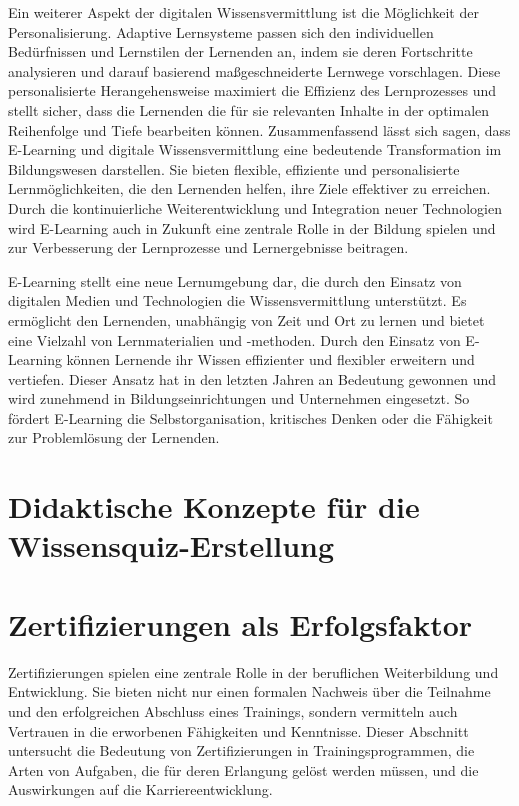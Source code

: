 Ein weiterer Aspekt der digitalen Wissensvermittlung ist die Möglichkeit der Personalisierung. Adaptive Lernsysteme passen sich den individuellen Bedürfnissen und Lernstilen der Lernenden an, indem sie deren Fortschritte analysieren und darauf basierend maßgeschneiderte Lernwege vorschlagen. Diese personalisierte Herangehensweise maximiert die Effizienz des Lernprozesses und stellt sicher, dass die Lernenden die für sie relevanten Inhalte in der optimalen Reihenfolge und Tiefe bearbeiten können.
Zusammenfassend lässt sich sagen, dass E-Learning und digitale Wissensvermittlung eine bedeutende Transformation im Bildungswesen darstellen. Sie bieten flexible, effiziente und personalisierte Lernmöglichkeiten, die den Lernenden helfen, ihre Ziele effektiver zu erreichen. Durch die kontinuierliche Weiterentwicklung und Integration neuer Technologien wird E-Learning auch in Zukunft eine zentrale Rolle in der Bildung spielen und zur Verbesserung der Lernprozesse und Lernergebnisse beitragen.

E-Learning stellt eine neue Lernumgebung dar, die durch den Einsatz von digitalen Medien und 
Technologien die Wissensvermittlung unterstützt. Es ermöglicht den Lernenden, unabhängig von Zeit und 
Ort zu lernen und bietet eine Vielzahl von Lernmaterialien und -methoden. %
Durch den Einsatz von E-Learning können Lernende ihr Wissen effizienter und flexibler erweitern und vertiefen. %
Dieser Ansatz hat in den letzten Jahren an Bedeutung gewonnen und wird zunehmend in 
Bildungseinrichtungen und Unternehmen eingesetzt. So fördert E-Learning die Selbstorganisation, kritisches
Denken oder die Fähigkeit zur Problemlösung der Lernenden. 

\section{Didaktische Konzepte für die Wissensquiz-Erstellung}

\section{Zertifizierungen als Erfolgsfaktor}
Zertifizierungen spielen eine zentrale Rolle in der beruflichen Weiterbildung und Entwicklung. Sie bieten nicht nur einen formalen Nachweis über die Teilnahme und den erfolgreichen Abschluss eines Trainings, sondern vermitteln auch Vertrauen in die erworbenen Fähigkeiten und Kenntnisse. Dieser Abschnitt untersucht die Bedeutung von Zertifizierungen in Trainingsprogrammen, die Arten von Aufgaben, die für deren Erlangung gelöst werden müssen, und die Auswirkungen auf die Karriereentwicklung. %

